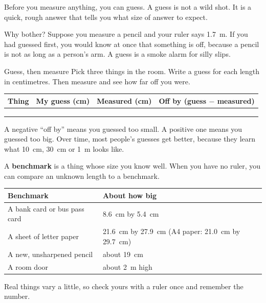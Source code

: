 \label{ch3}

Before you measure anything, you can guess. A guess is not a wild shot. It is a quick, rough answer that tells you what size of answer to expect.

Why bother? Suppose you measure a pencil and your ruler says 1.7~m. If you had guessed first, you would know at once that something is off, because a pencil is not as long as a person's arm. A guess is a smoke alarm for silly slips.

\begin{tryit}{Guess, then measure}
Pick three things in the room. Write a guess for each length in centimetres. Then measure and see how far off you were.
\par\medskip
\renewcommand{\arraystretch}{1.8}
\begin{tabularx}{\linewidth}{|>{\sffamily\small}p{2.2cm}|X|X|X|}
\hline
\textbf{Thing} & \textbf{My guess (cm)} & \textbf{Measured (cm)} & \textbf{Off by (guess $-$ measured)}\\ \hline
 & & & \\ \hline
 & & & \\ \hline
 & & & \\ \hline
\end{tabularx}
\end{tryit}

A negative ``off by'' means you guessed too small. A positive one means you guessed too big. Over time, most people's guesses get better, because they learn what 10~cm, 30~cm or 1~m looks like.

A \textbf{benchmark} is a thing whose size you know well. When you have no ruler, you can compare an unknown length to a benchmark.

\begin{center}
\sffamily\small\renewcommand{\arraystretch}{1.5}
\begin{tabular}{@{}ll@{}}
\toprule
\textbf{Benchmark} & \textbf{About how big}\\
\midrule
A bank card or bus pass card & 8.6~cm by 5.4~cm\\
A sheet of letter paper & 21.6~cm by 27.9~cm (A4 paper: 21.0~cm by 29.7~cm)\\
A new, unsharpened pencil & about 19~cm\\
A room door & about 2~m high\\
\bottomrule
\end{tabular}
\end{center}
Real things vary a little, so check yours with a ruler once and remember the number.

